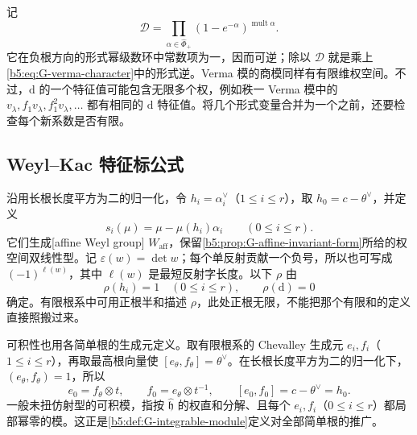 记
\[
	\mathcal D=\prod_{\alpha\in\widehat\Phi_+}(1-e^{-\alpha})^{\operatorname{mult}\alpha}.
\]
它在负根方向的形式幂级数环中常数项为一，因而可逆；除以 \(\mathcal D\) 就是乘上\eqref{b5:eq:G-verma-character}中的形式逆。Verma 模的商模同样有有限维权空间。不过，\(\mathrm d\) 的一个特征值可能包含无限多个权，例如秩一 Verma 模中的 \(v_\lambda,f_1v_\lambda,f_1^2v_\lambda,\ldots\) 都有相同的 \(\mathrm d\) 特征值。将几个形式变量合并为一个之前，还要检查每个新系数是否有限。

\subsection{Weyl–Kac 特征标公式}
\label{b5:subsec:G04:02}

沿用长根长度平方为二的归一化，令 \(h_i=\alpha_i^\vee\)（\(1\le i\le r\)），取 \(h_0=c-\theta^\vee\)，并定义
\[
	s_i(\mu)=\mu-\mu(h_i)\alpha_i\qquad(0\le i\le r).
\]
它们生成[affine Weyl group] \(W_{\mathrm{aff}}\)，保留\cref{b5:prop:G-affine-invariant-form}所给的权空间双线性型。记 \(\varepsilon(w)=\det w\)；每个单反射贡献一个负号，所以也可写成 \((-1)^{\ell(w)}\)，其中 \(\ell(w)\) 是最短反射字长度。以下 \(\rho\) 由
\[
	\rho(h_i)=1\quad(0\le i\le r),\qquad \rho(\mathrm d)=0
\]
确定。有限根系中可用正根半和描述 \(\rho\)，此处正根无限，不能把那个有限和的定义直接照搬过来。

可积性也用各简单根的生成元定义。取有限根系的 Chevalley 生成元 \(e_i,f_i\)（\(1\le i\le r\)），再取最高根向量使 \([e_\theta,f_\theta]=\theta^\vee\)。在长根长度平方为二的归一化下，\((e_\theta,f_\theta)=1\)，所以
\[
	e_0=f_\theta\otimes t,\qquad f_0=e_\theta\otimes t^{-1},\qquad [e_0,f_0]=c-\theta^\vee=h_0.
\]
一般未扭仿射型的可积模，指按 \(\widehat{\mathfrak h}\) 的权直和分解、且每个 \(e_i,f_i\)（\(0\le i\le r\)）都局部幂零的模。这正是\cref{b5:def:G-integrable-module}定义对全部简单根的推广。

